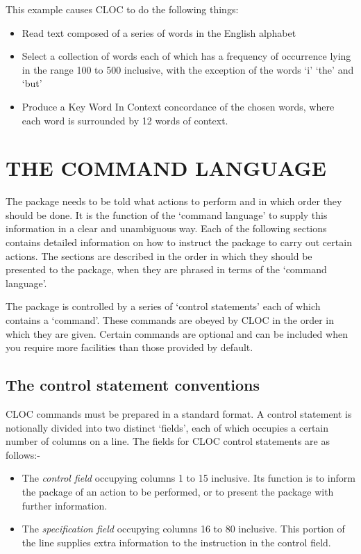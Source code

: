 This example causes CLOC to do the following things:
\begin{itemize}
\item Read text composed of a series of words in the English alphabet
\item Select a collection of words each of which has a frequency of
      occurrence lying in the range 100 to 500 inclusive, with the
      exception of the words `i' `the' and `but'
\item Produce a Key Word In Context concordance of the chosen words,
      where each word is surrounded by 12 words of context.
\end{itemize}

\section{THE COMMAND LANGUAGE}
\label{rules}
The package needs to be told what actions to perform and in
which order they should be done.  It is the function of the `command
language' to supply this information in a clear and unambiguous
way.  Each of the following sections contains detailed information
on how to instruct the package to carry out certain actions.  The
sections are described in the order in which they should be presented
to the package, when they are phrased in terms of the `command
language'.

The package is controlled by a series of `control statements' each of
which contains a `command'.  These commands are obeyed by CLOC
in the order in which they are given.  Certain commands are
optional and can be included when you require more
facilities than those provided by default.

\subsection{The control statement conventions}
CLOC commands must be prepared in a standard
format.  A control statement is notionally divided into two distinct
`fields', each of which occupies a certain number of columns
on a line.  The fields for CLOC control statements are as
follows:-
\begin{itemize}
\item The {\em control field} occupying columns 1 to 15 inclusive.
      Its function is to inform the package of an action to be
      performed, or to present the package with further information.
\item The {\em specification field} occupying columns 16 to 80
      inclusive.  This portion of the line supplies extra
      information to the instruction in the control field.
\end{itemize}


